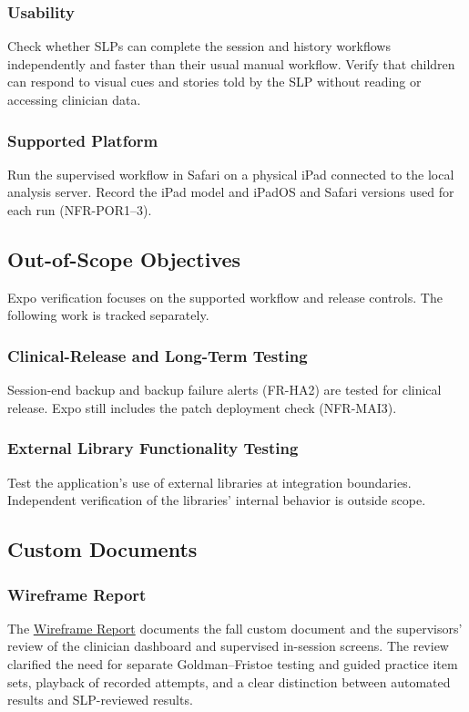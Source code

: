 \documentclass[12pt, titlepage]{article}
\begin{document}
\subsubsection{Usability}
Check whether SLPs can complete the session and history workflows
independently and faster than their usual manual workflow. Verify that
children can respond to visual cues and stories told by the SLP without
reading or accessing clinician data.

\subsubsection{Supported Platform}
Run the supervised workflow in Safari on a physical iPad connected to the
local analysis server. Record the iPad model and iPadOS and Safari versions
used for each run (NFR-POR1--3).

\subsection{Out-of-Scope Objectives}
Expo verification focuses on the supported workflow and release controls.
The following work is tracked separately.

\subsubsection{Clinical-Release and Long-Term Testing}
Session-end backup and backup failure alerts (FR-HA2) are tested for
clinical release. Expo still includes the patch deployment check (NFR-MAI3).

\subsubsection{External Library Functionality Testing}
Test the application's use of external libraries at integration boundaries.
Independent verification of the libraries' internal behavior is outside scope.

\subsection{Custom Documents}

\subsubsection{Wireframe Report}

The \href{https://github.com/lilyporter/Ghoti/blob/main/pdfs/CDs/Wireframe/Wireframe.pdf}{Wireframe Report} documents the
fall custom document and the supervisors' review of the clinician dashboard
and supervised in-session screens. The review clarified the need for
separate Goldman--Fristoe testing and guided practice item sets, playback
of recorded attempts, and a clear distinction between automated results
and SLP-reviewed results.
\end{document}
